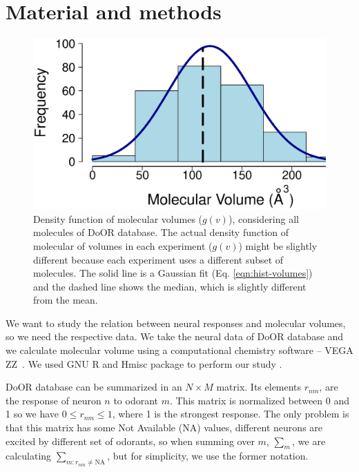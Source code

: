 \documentclass[11pt]{paper} %
\begin{document}
 

\section{Material and methods}
\begin{figure}
	\centering
	\includegraphics[width=0.5 \textwidth]{fig/hist-volumes}
	\caption{Density function of molecular volumes ($g(v)$), considering all molecules of DoOR database. 
		The actual density function of molecular of volumes in each experiment ($g(v)$) might be slightly different 
		because each experiment uses a different subset of molecules. 
		The solid line is a Gaussian fit (Eq. \ref{eqn:hist-volumes}) and the dashed line shows the median, 
		which is slightly different from 		the mean.}
	\label{fig:hist-volumes}
\end{figure}

We want to study the relation between neural responses and molecular volumes, so we need the respective data. 
We take the neural data of DoOR database \cite{Galizia2010} and we calculate molecular volume using a computational chemistry software -- VEGA ZZ~\cite{Pedretti2004}. 
We used  GNU R and Hmisc package to perform our study \cite{Rlanguage,Hmisc}.

DoOR database can be summarized in an $N\times M$ matrix. 
Its elements $r_{nm}$, are the response of neuron $n$ to odorant $m$. 
This matrix is normalized between 0 and 1 so we have $0 \le r_{nm} \le 1$, where 1 is the strongest response.
The only problem is that this matrix has some Not Available (NA) values, 
different neurons are excited by different set of odorants, 
so  when summing over $m$, $\sum_m$, we are calculating $\sum_{m: r_{nm} \neq \text{NA}}$, but for simplicity, 
we use the former notation. 
\end{document}
